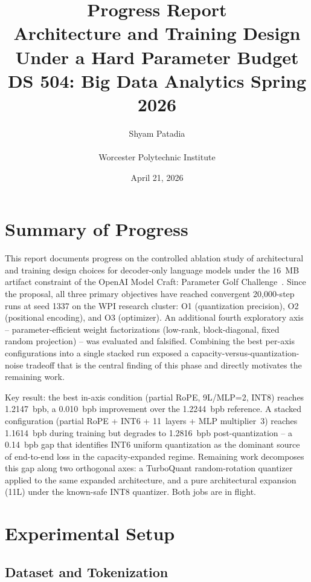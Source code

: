 \documentclass[11pt, letterpaper]{article}
\title{
    \textbf{Progress Report} \\[0.4em]
    \large Architecture and Training Design Under a Hard Parameter Budget \\[0.4em]
    \normalsize DS 504: Big Data Analytics \textendash{} Spring 2026
}
\author{Shyam Patadia \\ \\ Worcester Polytechnic Institute}
\date{April 21, 2026}
\begin{document}
\maketitle
\thispagestyle{empty}

\section{Summary of Progress}

This report documents progress on the controlled ablation study
of architectural and training design choices for decoder-only
language models under the 16~MB artifact constraint of the
OpenAI Model Craft: Parameter Golf Challenge~\cite{paramgolf2026}.
Since the proposal, all three primary objectives have reached
convergent 20{,}000-step runs at seed 1337 on the WPI research
cluster: O1 (quantization precision), O2 (positional encoding),
and O3 (optimizer). An additional fourth exploratory axis --
parameter-efficient weight factorizations (low-rank, block-diagonal,
fixed random projection) -- was evaluated and falsified.
Combining the best per-axis configurations into a single
stacked run exposed a capacity-versus-quantization-noise
tradeoff that is the central finding of this phase and directly
motivates the remaining work.

Key result: the best in-axis condition (partial RoPE, 9L/MLP=2,
INT8) reaches 1.2147~bpb, a 0.010~bpb improvement over the
1.2244~bpb reference. A stacked configuration
(partial RoPE + INT6 + 11~layers + MLP multiplier~3) reaches
1.1614~bpb during training but degrades to 1.2816~bpb post-quantization
-- a 0.14~bpb gap that identifies INT6 uniform quantization as
the dominant source of end-to-end loss in the capacity-expanded
regime. Remaining work decomposes this gap along two orthogonal axes:
a TurboQuant random-rotation quantizer~\cite{turboquant2024}
applied to the same expanded architecture, and a pure
architectural expansion (11L) under the known-safe INT8
quantizer. Both jobs are in flight.

\section{Experimental Setup}

\subsection{Dataset and Tokenization}
\end{document}
